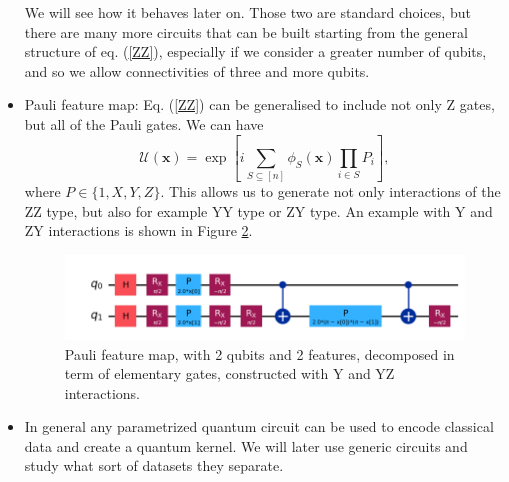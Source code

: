 \documentclass[12pt]{article}
\begin{document}
\begin{itemize}
\begin{figure}[h!]
        \label{fig:ZZ}
    \end{figure}
    We will see how it behaves later on. Those two are standard choices, but there are many more circuits that can be built starting from the general structure of eq. (\ref{ZZ}), especially if we consider a greater number of qubits, and so we allow connectivities of three and more qubits. 
    \item Pauli feature map: Eq. (\ref{ZZ}) can be generalised to include not only Z gates, but all of the Pauli gates. We can have
    \begin{equation}
        \mathcal{U}(\mathbf{x})=\exp\left[i\sum_{S\subseteq [n]}\phi_S(\mathbf{x})\prod_{i\in S}P_i\right],
        \label{pauli}
    \end{equation}
    where $P\in\{1,X,Y,Z\}$. This allows us to generate not only interactions of the ZZ type, but also for example YY type or ZY type. An example with Y and ZY interactions is shown in Figure \ref{fig:Pauli}.
    \begin{figure}[h!]
        \centering
        \includegraphics[width=\textwidth]{images/pauli.png}
        \caption{Pauli feature map, with 2 qubits and 2 features, decomposed in term of elementary gates, constructed with Y and YZ interactions.}
        \label{fig:Pauli}
    \end{figure}
    \item In general any parametrized quantum circuit can be used to encode classical data and create a quantum kernel. We will later use generic circuits and study what sort of datasets they separate.
\end{itemize}
\end{document}
